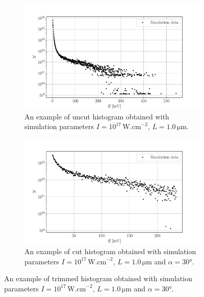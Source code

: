 \begin{figure}[h]
	\centering
		\begin{subfigure}{0.49\textwidth}
		\centering
		\includegraphics[width=\textwidth]{figures/untrimmed-hist}
		\caption{An example of uncut histogram obtained with simulation parameters $I=10^{17}\,\mathrm{W.cm}^{-2}$, $L=1.0\,\mathrm{\mu m}$.}
		\label{fig:ex-uncut}
	\end{subfigure}
	\hfill
	\begin{subfigure}{0.49\textwidth}
		\centering
		\includegraphics[width=\textwidth]{figures/trimmed-hist}
		\caption{An example of cut histogram obtained with simulation parameters $I=10^{17}\,\mathrm{W.cm}^{-2}$, $L=1.0\,\mathrm{\mu m}$ and $\alpha = 30$°.}
		\label{fig:ex-cut}
	\end{subfigure}
	\caption{An example of trimmed histogram obtained with simulation parameters $I=10^{17}\,\mathrm{W.cm}^{-2}$, $L=1.0\,\mathrm{\mu m}$ and $\alpha = 30$°.}
	\label{fig:trimmed-hist}
\end{figure}

